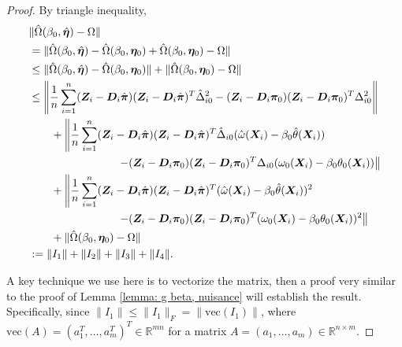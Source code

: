 \documentclass[12pt]{article}
\begin{document}
{\begin{proof}
By triangle inequality, 
	\begin{align*}
		 &\|\hat\Omega(\beta_0,\hat {\bm \eta})- \Omega \|\\
		 &= \|\hat\Omega(\beta_0,\hat {\bm \eta})  - \hat \Omega(\beta_0, \bm \eta_0) + \hat \Omega(\beta_0, \bm \eta_0) - \Omega \|\\
		 &\leq  \|\hat\Omega(\beta_0,\hat {\bm \eta})  - \hat \Omega(\beta_0, \bm \eta_0) \| +\|	 \hat \Omega(\beta_0, \bm \eta_0) - \Omega \| \\
		 & \leq \left\|  \frac{1}{n} \sum_{i=1}^{n} (\bm{Z}_i - \bm D_i \hat{\bm\pi}) (\bm{Z}_i - \bm D_i \hat{\bm\pi})^T \hat\Delta_{i0}^2-(\bm{Z}_i - \bm D_i {\bm\pi}_0) (\bm{Z}_i - \bm D_i {\bm\pi}_0)^T \Delta_{i0}^2  \right\|\\
		 & \qquad+  \left\|  \frac{1}{n} \sum_{i=1}^{n} (\bm{Z}_i - \bm D_i \hat{\bm\pi}) (\bm{Z}_i - \bm D_i \hat{\bm\pi})^T \hat\Delta_{i0}(\hat\omega(\bm{X}_i)- \beta_0\hat\theta(\bm{X}_i)) \right.\\
		 & \qquad\qquad\qquad\qquad \left.-(\bm{Z}_i - \bm D_i {\bm\pi}_0) (\bm{Z}_i - \bm D_i {\bm\pi}_0)^T \Delta_{i0}(\omega_0(\bm{X}_i)- \beta_0\theta_0(\bm{X}_i)) \right\|\\
		 &\qquad + \left\|  \frac{1}{n} \sum_{i=1}^{n} (\bm{Z}_i - \bm D_i \hat{\bm\pi}) (\bm{Z}_i - \bm D_i \hat{\bm\pi})^T(\hat\omega(\bm{X}_i)- \beta_0\hat\theta(\bm{X}_i))^2  \right.\\
		 &\qquad\qquad\qquad\qquad \left.-(\bm{Z}_i - \bm D_i {\bm\pi}_0) (\bm{Z}_i - \bm D_i {\bm\pi}_0)^T (\omega_0(\bm{X}_i)- \beta_0\theta_0(\bm{X}_i))^2  \right\|\\
		 &\qquad +\|	 \hat \Omega(\beta_0, \bm \eta_0) - \Omega \| \\
		 &:= \|I_1\|+\|I_2\|+\|I_3\|+\|I_4\|.
	\end{align*}

A key technique we use here is to vectorize the matrix, then a proof very similar to the proof of Lemma \ref{lemma: g beta, nuisance} will establish the result. Specifically, since $ \|I_1\|\leq \|I_1\|_F= \|\text{vec} (I_1)\| $, where $ \text{vec}(A)= (a_1^T, \dots, a_m^T)^T\in \mathbb{R}^{mn}  $ for a matrix $ A= (a_1, \dots, a_m) \in\mathbb{R}^{n\times m}$.  


\end{proof}}
\end{document}
